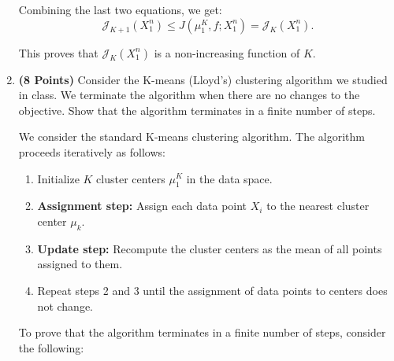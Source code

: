 \documentclass[a4paper]{article}
\newcounter{thm}
\newcommand{\Jcal}{\mathcal{J}}
\theoremstyle{definition}
\newenvironment{soln}{
    \leavevmode\color{blue}\ignorespaces
}{}
\begin{document}
\begin{enumerate}
\begin{soln}
  Combining the last two equations, we get:
  \begin{equation}
      \Jcal_{K+1}(X_1^n) \leq J(\mu_1^K, f; X_1^n) = \Jcal_K(X_1^n).
  \end{equation}

  This proves that \( \Jcal_{K}(X_1^n) \) is a non-increasing function of \( K \).

\end{soln}

\item \textbf{(8 Points)}
Consider the K-means (Lloyd's) clustering algorithm we studied in class. We
terminate the algorithm when there are no changes to the objective.
Show that the algorithm terminates in a finite number of steps.
\begin{soln}
  We consider the standard K-means clustering algorithm. The algorithm proceeds iteratively as follows:
  \begin{enumerate}
      \item Initialize \( K \) cluster centers \( \mu_1^K \) in the data space.
      \item \textbf{Assignment step:} Assign each data point \( X_i \) to the nearest cluster center \( \mu_k \).
      \item \textbf{Update step:} Recompute the cluster centers as the mean of all points assigned to them.
      \item Repeat steps 2 and 3 until the assignment of data points to centers does not change.
  \end{enumerate}

  To prove that the algorithm terminates in a finite number of steps, consider the following:


\end{soln}
\end{enumerate}
\end{document}
